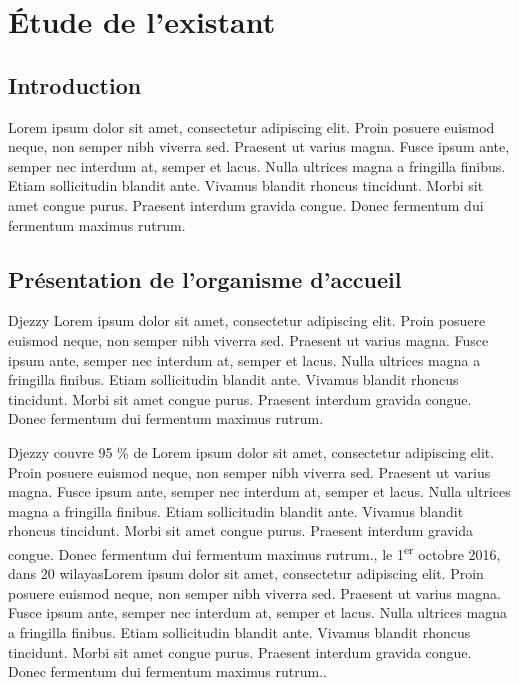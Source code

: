 \chapter{Étude de l'existant}
\clearpage
\label{sec:organisme}

\section{Introduction}
Lorem ipsum dolor sit amet, consectetur adipiscing elit. Proin posuere euismod neque, non semper nibh viverra sed. Praesent ut varius magna. Fusce ipsum ante, semper nec interdum at, semper et lacus. Nulla ultrices magna a fringilla finibus. Etiam sollicitudin blandit ante. Vivamus blandit rhoncus tincidunt. Morbi sit amet congue purus. Praesent interdum gravida congue. Donec fermentum dui fermentum maximus rutrum.


\section{Présentation de l’organisme d’accueil}
Djezzy Lorem ipsum dolor sit amet, consectetur adipiscing elit. Proin posuere euismod neque, non semper nibh viverra sed. Praesent ut varius magna. Fusce ipsum ante, semper nec interdum at, semper et lacus. Nulla ultrices magna a fringilla finibus. Etiam sollicitudin blandit ante. Vivamus blandit rhoncus tincidunt. Morbi sit amet congue purus. Praesent interdum gravida congue. Donec fermentum dui fermentum maximus rutrum.

\medskip

Djezzy couvre 95 \% de Lorem ipsum dolor sit amet, consectetur adipiscing elit. Proin posuere euismod neque, non semper nibh viverra sed. Praesent ut varius magna. Fusce ipsum ante, semper nec interdum at, semper et lacus. Nulla ultrices magna a fringilla finibus. Etiam sollicitudin blandit ante. Vivamus blandit rhoncus tincidunt. Morbi sit amet congue purus. Praesent interdum gravida congue. Donec fermentum dui fermentum maximus rutrum., le 1\textsuperscript{er} octobre 2016, dans 20 wilayasLorem ipsum dolor sit amet, consectetur adipiscing elit. Proin posuere euismod neque, non semper nibh viverra sed. Praesent ut varius magna. Fusce ipsum ante, semper nec interdum at, semper et lacus. Nulla ultrices magna a fringilla finibus. Etiam sollicitudin blandit ante. Vivamus blandit rhoncus tincidunt. Morbi sit amet congue purus. Praesent interdum gravida congue. Donec fermentum dui fermentum maximus rutrum..

\medskip

